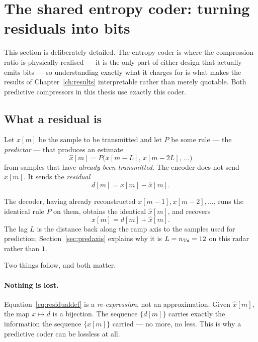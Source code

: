 \section{The shared entropy coder: turning residuals into bits}
\label{sec:entropycoder}

This section is deliberately detailed. The entropy coder is where the
compression ratio is physically realised --- it is the only part of either
design that actually emits bits --- so understanding exactly what it charges
for is what makes the results of Chapter~\ref{ch:results} interpretable rather
than merely quotable. Both predictive compressors in this thesis use exactly
this coder.

\subsection{What a residual is}
\label{sec:whatresidual}

Let $x[m]$ be the sample to be transmitted and let $P$ be some rule --- the
\emph{predictor} --- that produces an estimate
\begin{equation}
\hat{x}[m] = P\bigl(x[m-L],\, x[m-2L],\, \ldots\bigr)
\end{equation}
from samples that have \emph{already been transmitted}. The encoder does not
send $x[m]$. It sends the \emph{residual}
\begin{equation}
\label{eq:residualdef}
d[m] = x[m] - \hat{x}[m].
\end{equation}

The decoder, having already reconstructed $x[m-1], x[m-2], \ldots$, runs the
identical rule $P$ on them, obtains the identical $\hat{x}[m]$, and recovers
\begin{equation}
x[m] = d[m] + \hat{x}[m].
\end{equation}
The lag $L$ is the distance back along the ramp axis to the samples used for
prediction; Section~\ref{sec:predaxis} explains why it is $L = n_{\mathrm{Tx}} = 12$ on
this radar rather than $1$.

Two things follow, and both matter.

\paragraph{Nothing is lost.}
Equation~\eqref{eq:residualdef} is a \emph{re-expression}, not an
approximation. Given $\hat{x}[m]$, the map $x \mapsto d$ is a bijection. The
sequence $\{d[m]\}$ carries exactly the information the sequence $\{x[m]\}$
carried --- no more, no less. This is why a predictive coder can be lossless at
all.

